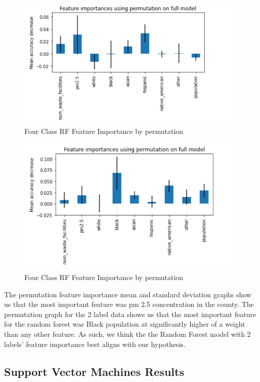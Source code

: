 \documentclass{article}
\begin{document}
\begin{figure}[h]
\caption{Four Class RF Feature Importance by permutation}
\includegraphics[scale=0.45]{featimprf1.PNG}
\end{figure}

\begin{figure}[h]
\caption{Four Class RF Feature Importance by permutation}
\includegraphics[scale=0.45]{featimprf2.PNG}
\end{figure}

The permutation feature importance mean and standard deviation graphs show us that the most important feature was pm 2.5 concentration in the county. The permutation graph for the 2 label data shows us that the most important feature for the random forest was Black population at significantly higher of a weight than any other feature. As such, we think the the Random Forest model with 2 labels' feature importance best aligns  with our hypothesis.


\subsection{Support Vector Machines Results}
\label{SVM results}
\end{document}

